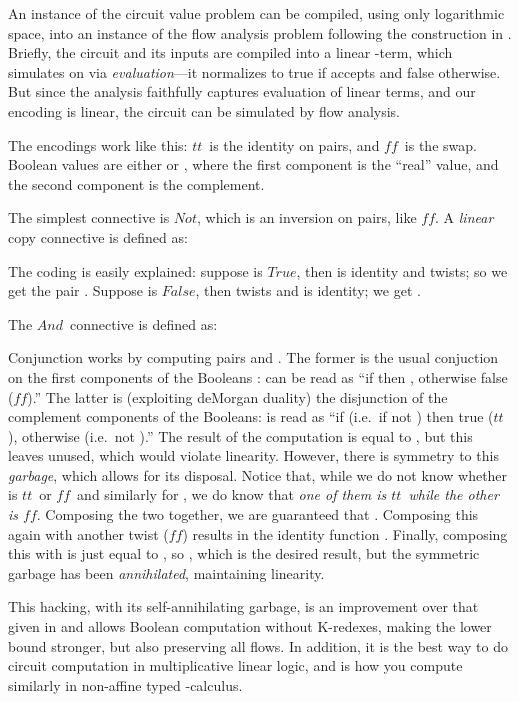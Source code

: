 \documentclass{llncs}
\newcommand\True{\ensuremath{\mathit{True}}}
\newcommand\False{\ensuremath{\mathit{False}}}
\newcommand\TT{\ensuremath{\mathit{tt}}}
\newcommand\FF{\ensuremath{\mathit{ff}}}
\newcommand\Not{\ensuremath{\mathit{Not}}}
\newcommand\And{\ensuremath{\mathit{And}}}
\begin{document}
An instance of the circuit value problem can be compiled, using only
logarithmic space, into an instance of the flow analysis problem
following the construction in \cite{vanhorn-mairson-07}.  Briefly, the
circuit and its inputs are compiled into a linear -term,
which simulates  on  via {\em evaluation}---it normalizes
to true if  accepts  and false otherwise.  But since the
analysis faithfully captures evaluation of linear terms, and our
encoding is linear, the circuit can be simulated by flow analysis.

The encodings work like this: \TT\ is the identity on pairs, and \FF\
is the swap.  Boolean values are either  or
, where the first component is the ``real''
value, and the second component is the complement.  


The simplest connective is \Not, which is an inversion on pairs, like
\FF.  A {\em linear} copy connective is defined as:

The coding is easily explained: suppose  is \True, then  is identity and 
twists; so we get the pair .  Suppose 
is \False, then  twists and  is identity; we get
.  

The \And\ connective is defined as:


Conjunction works by computing pairs  and
.  The former is the usual conjuction on the
first components of the Booleans :  can be read as ``if  then , otherwise false
(\FF).''  The latter is (exploiting deMorgan duality) the disjunction of
the complement components of the Booleans: 
is read as ``if  (i.e.~if not ) then true (\TT), otherwise
 (i.e.~not ).''  The result of the computation is equal to
, but this leaves  unused, which
would violate linearity.  However, there is symmetry to this {\em
garbage}, which allows for its disposal.  Notice that, while we do not
know whether  is \TT\ or \FF\ and similarly for , we do know
that {\em one of them is \TT\ while the other is \FF}.  Composing the
two together, we are guaranteed that .  Composing
this again with another twist (\FF) results in the identity function
.  Finally, composing this with 
is just equal to , so , which is the desired result,
but the symmetric garbage has been {\em annihilated}, maintaining
linearity.

This hacking, with its self-annihilating garbage, is an improvement
over that given in \cite{mairson-jfp04} and allows Boolean computation
without K-redexes, making the lower bound stronger, but also
preserving all flows.  In addition, it is the best way to do circuit
computation in multiplicative linear logic, and is how you compute
similarly in non-affine typed -calculus.
\end{document}
